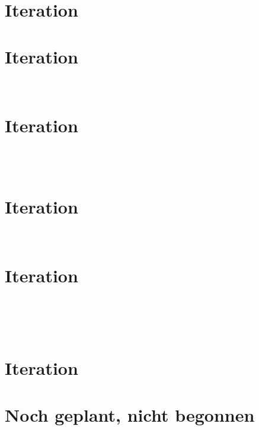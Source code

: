 \documentclass
[english,accentcolor=tud1c]
{tudreport}
\begin{document}
	\chapter{Iteration}
	

	\chapter{Iteration}
	\\
	

	\chapter{Iteration}
	\\
	\\
	

	\chapter{Iteration}
	\\
	

	\chapter{Iteration}
	\\
	\\
	\\
	

	\chapter{Iteration}


\chapter*{Noch geplant, nicht begonnen}

	\\
\end{document}
